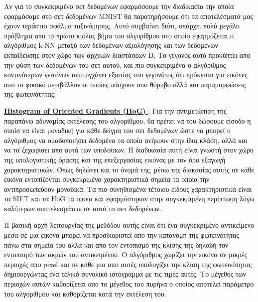 \par
Αν για το συγκεκριμένο σετ δεδομένων εφαρμόσουμε την διαδικασία την οποία εφαρμόσαμε στο σετ δεδομένων \textlatin{MNIST}\textlatin{\cite{mnist}} θα παρατηρήσουμε ότι τα αποτελέσματά μας έχουν τεράστιο σφάλμα ταξινόμησης. Αυτό συμβαίνει διότι, υπάρχει πολύ μεγάλο πρόβλημα απο το πρώτο κιόλας βήμα του αλγορίθμου στο οποίο εφαρμόζεται ο αλγόριθμος \textlatin{k-NN} μεταξύ των δεδομένων αξιολόγησης και των δεδομένων εκπαίδευσης στον χώρο των αρχικών διαστάσεων \textlatin{D}. Το γεγονός αυτό προκύπτει απο την φύση των δεδομένων του σετ αυτού, και πιο συγκεκριμένα ο αλγόριθμος κοντινότερων γειτόνων αποτυγχάνει εξαιτίας του γεγονότος ότι πρόκειται για εικόνες απο το φυσικό περιβάλλον οι οποίες πάσχουν απο θόρυβο αλλά και παραμορφώσεις της φωτεινότητας. 
\par
\href{https://en.wikipedia.org/wiki/Histogram_of_oriented_gradients}{\textbf{\textlatin{Histogram of Oriented Gradients (HoG) }}}\textlatin{\cite{hog}}: Για την αντιμετώπιση της παραπάνω αδυναμίας εκτέλεσης του αλγορίθμου, θα πρέπει να του δώσουμε είσοδο η οποία να είναι μοναδική για κάθε δείγμα του σετ δεδομένων ώστε να μπορεί ο αλγόριθμος να ομαδοποιήσει δεδομένα τα οποία ανήκουν στην ίδια κλάση, αλλά και να τα ξεχωρίσει απο αυτά των υπολοίπων. Η διαδικασία αυτή είναι γνωστή στον χώρο της υπολογιστικής όρασης και της επεξεργασίας εικόνας με τον όρο εξαγωγή χαρακτηριστικών. Όπως δηλώνει και το όνομά της, μέσω της διακασίας αυτής σε κάθε εικόνα εντοπίζονται συγκεκριμένα χαρακτηριστικά σημεία τα οποία την αντιπροσωπεύουν μοναδικά. Τα πιο συνηθισμένα τέτοιου είδους χαρακτηριστικά είναι τα \textlatin{SIFT}\textlatin{\cite{sift}} και τα \textlatin{HoG}\textlatin{\cite{hog}} τα οποία και εφαρμόστηκαν στην συγκεκριμένη περίπτωση λόγω καλύτερων αποτελεσμάτων σε αυτό το σετ δεδομένων. 
\par
Η βασική αρχή λειτουργίας της μεθόδου αυτής είναι ότι ένα συγκεκριμένο αντικείμενο μέσα σε μια εικόνα μπορεί να προσδιοριστεί απο την κατανομή της φωτεινότητας πάνω στα σημεία του αλλά και απο τον εντοπισμό της κλίσης της δηλαδή τον εντοπισμό των ακμών του αντικειμένου. Ο αλγόριθμος χωρίζει την εικόνα σε μικρές περιοχές απο \textlatin{pixel} και σε κάθε μια απο αυτές υπολογίζει την κλίση της φωτεινότητας δημιουργώντας ένα τελικό συνολικό ιστόγραμμα με τις τιμές αυτές. Το μέγεθος των περιοχών αυτών καθορίζεται απο το μέγεθος του πυρήνα ο οποίος αποτελεί παράμετρο του αλγορίθμου και καθορίζεται κατά την εκτέλεση του.

